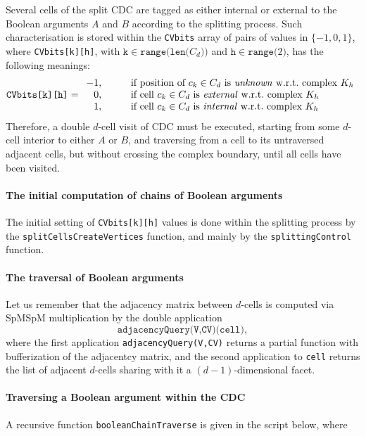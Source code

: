 \documentclass[11pt,oneside]{article}	%
\begin{document}
Several cells of the split CDC are tagged as either internal or external to the Boolean arguments $A$ and $B$ according to the splitting process. Such characterisation is stored within the \texttt{CVbits} array of pairs of values in $\{ -1,0,1\}$, where \texttt{CVbits[k][h]}, with $\texttt{k}\in\texttt{range(len(}C_d\texttt{))}$ and $\texttt{h}\in \texttt{range(}2\texttt{)}$, has the following meanings: 
\[
\texttt{CVbits[k][h]} = 
\begin{array}{rcl}
-1, &\quad & \mbox{if position of\ } c_k\in C_d \mbox{\ is \emph{unknown} w.r.t.~complex\ }K_h \\ 
0, &\quad & \mbox{if cell\ }c_k\in C_d \mbox{\ is \emph{external} w.r.t.~complex\ }K_h \\ 
1,  &\quad & \mbox{if cell\ }c_k\in C_d \mbox{\ is \emph{internal} w.r.t.~complex\ }K_h 
\end{array}
\]
Therefore, a double $d$-cell visit of CDC must be executed, starting from some $d$-cell interior to either $A$ or $B$, and traversing from a cell to its untraversed adjacent cells, but without crossing the complex boundary, until all cells have been visited. 

\paragraph{The initial computation of chains of Boolean arguments}

The initial setting of \texttt{CVbits[k][h]} values is done within the splitting process by the \texttt{splitCellsCreateVertices} function, and mainly by the \texttt{splittingControl} function.

\paragraph{The traversal of Boolean arguments}
Let us remember that the adjacency matrix between $d$-cells is computed via SpMSpM multiplication by the double application 
\[
\texttt{adjacencyQuery(V,CV)(cell)}, 
\] 
where the first application \texttt{adjacencyQuery(V,CV)}
returns a partial function with bufferization of the adjacentcy matrix, and the second application to \texttt{cell} returns the list of adjacent $d$-cells sharing with it a $(d-1)$-dimensional facet.

\paragraph{Traversing a Boolean argument within the CDC}
A recursive function \texttt{booleanChainTraverse} is given in the script below, where 
\end{document}
